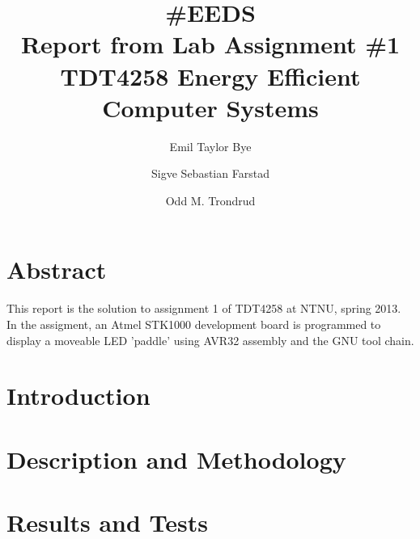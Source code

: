 \documentclass{article}
\begin{document}

\title{\#EEDS\\Report from Lab Assignment \#1\\TDT4258 Energy Efficient Computer Systems}
\author{Emil Taylor Bye}
\author{Sigve Sebastian Farstad}
\author{Odd M. Trondrud}
\maketitle

\newpage

\setcounter{secnumdepth}{-1}


\part{Abstract}

This report is the solution to assignment 1 of TDT4258 at NTNU, spring 2013.
In the assigment, an Atmel STK1000 development board is programmed to display a moveable LED 'paddle' using AVR32 assembly and the GNU tool chain.

\part{Introduction}



\part{Description and Methodology}



\part{Results and Tests}
\end{document}
